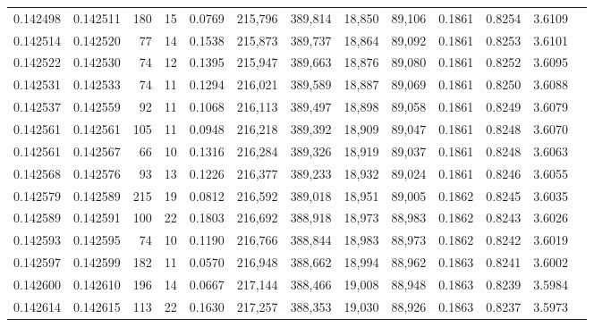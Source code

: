 \begin{tabular}{rrrrrrrrrrrrr}
0.142498 & 0.142511 &   180 &  15 &                                     0.0769 & 215,796 & 389,814 &  18,850 &  89,106 & 0.1861 & 0.8254 & 3.6109 \\
0.142514 & 0.142520 &    77 &  14 &                                     0.1538 & 215,873 & 389,737 &  18,864 &  89,092 & 0.1861 & 0.8253 & 3.6101 \\
0.142522 & 0.142530 &    74 &  12 &                                     0.1395 & 215,947 & 389,663 &  18,876 &  89,080 & 0.1861 & 0.8252 & 3.6095 \\
0.142531 & 0.142533 &    74 &  11 &                                     0.1294 & 216,021 & 389,589 &  18,887 &  89,069 & 0.1861 & 0.8250 & 3.6088 \\
0.142537 & 0.142559 &    92 &  11 &                                     0.1068 & 216,113 & 389,497 &  18,898 &  89,058 & 0.1861 & 0.8249 & 3.6079 \\
0.142561 & 0.142561 &   105 &  11 &                                     0.0948 & 216,218 & 389,392 &  18,909 &  89,047 & 0.1861 & 0.8248 & 3.6070 \\
0.142561 & 0.142567 &    66 &  10 &                                     0.1316 & 216,284 & 389,326 &  18,919 &  89,037 & 0.1861 & 0.8248 & 3.6063 \\
0.142568 & 0.142576 &    93 &  13 &                                     0.1226 & 216,377 & 389,233 &  18,932 &  89,024 & 0.1861 & 0.8246 & 3.6055 \\
0.142579 & 0.142589 &   215 &  19 &                                     0.0812 & 216,592 & 389,018 &  18,951 &  89,005 & 0.1862 & 0.8245 & 3.6035 \\
0.142589 & 0.142591 &   100 &  22 &                                     0.1803 & 216,692 & 388,918 &  18,973 &  88,983 & 0.1862 & 0.8243 & 3.6026 \\
0.142593 & 0.142595 &    74 &  10 &                                     0.1190 & 216,766 & 388,844 &  18,983 &  88,973 & 0.1862 & 0.8242 & 3.6019 \\
0.142597 & 0.142599 &   182 &  11 &                                     0.0570 & 216,948 & 388,662 &  18,994 &  88,962 & 0.1863 & 0.8241 & 3.6002 \\
0.142600 & 0.142610 &   196 &  14 &                                     0.0667 & 217,144 & 388,466 &  19,008 &  88,948 & 0.1863 & 0.8239 & 3.5984 \\
0.142614 & 0.142615 &   113 &  22 &                                     0.1630 & 217,257 & 388,353 &  19,030 &  88,926 & 0.1863 & 0.8237 & 3.5973 \\

\end{tabular}
